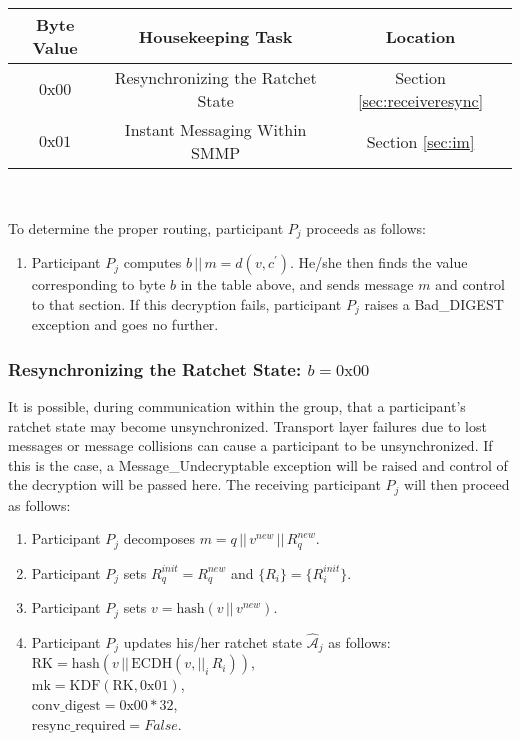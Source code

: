 \documentclass[%
preprint,
amsmath,amssymb,
aps,
prb,
floatfix,
]{revtex4-1}
\begin{document}
\begin{centering}
\begin{tabular}{|c|c|c|}
\hline
Byte Value & Housekeeping Task & Location \\
\hline
$0\mathrm{x}00$ & Resynchronizing the Ratchet State  & Section \ref{sec:receiveresync}\\
$0\mathrm{x}01$ & Instant Messaging Within SMMP & Section \ref{sec:im}\\
\hline
\end{tabular} \\
\end{centering}
\bigskip
To determine the proper routing, participant $P_j$ proceeds as follows:
\begin{enumerate}
\item Participant $P_j$ computes $b \, || \, m = d(v, c^\prime)$. He/she then
finds the value corresponding to byte $b$ in the table above, and sends message
$m$ and control to that section.
If this decryption fails, participant $P_j$ raises a Bad\_DIGEST exception and
goes no further.
\end{enumerate}
\subsubsection{\label{sec:receiveresync}Resynchronizing the Ratchet State: $b =
0\mathrm{x}00$}
It is possible, during communication within the group, that a participant's
ratchet state may become unsynchronized. Transport layer failures due to lost
messages or message collisions can cause a participant to be unsynchronized. If
this is the case, a Message\_Undecryptable exception will be raised
and control of the decryption will be passed here. The receiving participant
$P_j$ will then proceed as follows:
\begin{enumerate}
\item Participant $P_j$ decomposes $m = q \, || \, v^{new} \, || \, R_q^{new}$.
\item Participant $P_j$ sets $R_q^{init} = R_q^{new}$ and $\{R_i\} =
\{R_i^{init}\}$.
\item Participant $P_j$ sets $v = \mathrm{hash}(v \, || \, v^{new})$.
\item Participant $P_j$ updates his/her ratchet state
$\mathcal{\hat{A}}_j$ as follows:\\
$\mathrm{RK} = \mathrm{hash}(v \, || \, \mathrm{ECDH}(v, ||_i
\, R_i))$, \\
$\mathrm{mk} = \mathrm{KDF}(\mathrm{RK}, 0\mathrm{x}01)$, \\
$\mathrm{conv\_digest} = 0\mathrm{x}00 * 32$, \\
$\mathrm{resync\_required} = False$.
\end{enumerate}
\end{document}
